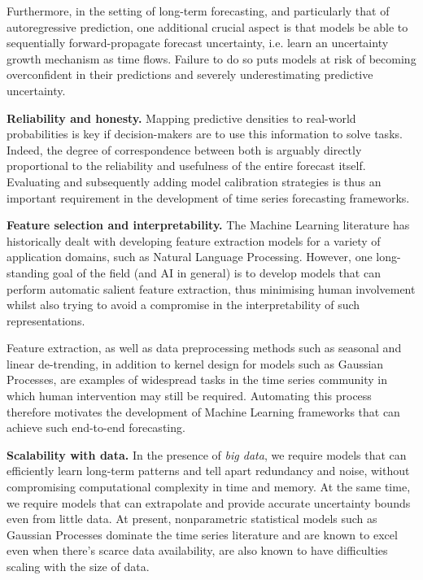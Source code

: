 \documentclass[pdftex,12pt,a4paper]{article}
\theoremstyle{definition}
\theoremstyle{remark}
\begin{document}
Furthermore, in the setting of long-term forecasting, and particularly that of autoregressive prediction, one additional crucial aspect is that models be able to sequentially forward-propagate forecast uncertainty, i.e. learn an uncertainty growth mechanism as time flows. Failure to do so puts models at risk of becoming overconfident in their predictions and severely underestimating predictive uncertainty. 
    
\textbf{Reliability and honesty.} Mapping predictive densities to real-world probabilities is key \citep{guo2017calibration} if decision-makers are to use this information to solve tasks. Indeed, the degree of correspondence between both is arguably directly proportional to the reliability and usefulness of the entire forecast itself. Evaluating and subsequently adding model calibration strategies is thus an important requirement in the development of time series forecasting frameworks.

\textbf{Feature selection and interpretability.} The Machine Learning literature has historically dealt with developing feature extraction models for a variety of application domains, such as Natural Language Processing. However, one long-standing goal of the field  (and AI in general) is to develop models that can perform automatic salient feature extraction, thus minimising human involvement whilst also trying to avoid a compromise in the interpretability of such representations. 

Feature extraction, as well as data preprocessing methods such as seasonal and linear de-trending, in addition to kernel design for models such as Gaussian Processes, are examples of widespread tasks in the time series community in which human intervention may still be required. Automating this process therefore motivates the development of Machine Learning frameworks that can achieve such end-to-end forecasting.

\textbf{Scalability with data.} In the presence of \textit{big data}, we require models that can efficiently learn long-term patterns and tell apart redundancy and noise, without compromising computational complexity in time and memory. At the same time, we require models that can extrapolate and provide accurate uncertainty bounds even from little data. At present, nonparametric statistical models such as Gaussian Processes dominate the time series literature and are known to excel even when there's scarce data availability,  are also known to have difficulties scaling with the size of data.
\end{document}
